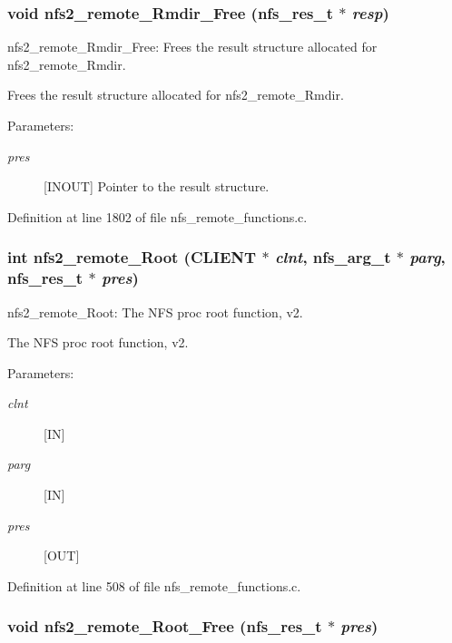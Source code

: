 \subsubsection{\setlength{\rightskip}{0pt plus 5cm}void nfs2\_\-remote\_\-Rmdir\_\-Free (nfs\_\-res\_\-t $\ast$ {\em resp})}\label{group__NFSprocs_ga64}


nfs2\_\-remote\_\-Rmdir\_\-Free: Frees the result structure allocated for nfs2\_\-remote\_\-Rmdir.

Frees the result structure allocated for nfs2\_\-remote\_\-Rmdir.

\begin{Desc}
\item[Parameters:]
\begin{description}
\item[{\em pres}][INOUT] Pointer to the result structure. \end{description}
\end{Desc}


Definition at line 1802 of file nfs\_\-remote\_\-functions.c.
\subsubsection{\setlength{\rightskip}{0pt plus 5cm}int nfs2\_\-remote\_\-Root (CLIENT $\ast$ {\em clnt}, nfs\_\-arg\_\-t $\ast$ {\em parg}, nfs\_\-res\_\-t $\ast$ {\em pres})}\label{group__NFSprocs_ga3}


nfs2\_\-remote\_\-Root: The NFS proc root function, v2.

The NFS proc root function, v2.

\begin{Desc}
\item[Parameters:]
\begin{description}
\item[{\em clnt}][IN] \item[{\em parg}][IN] \item[{\em pres}][OUT] \end{description}
\end{Desc}


Definition at line 508 of file nfs\_\-remote\_\-functions.c.
\subsubsection{\setlength{\rightskip}{0pt plus 5cm}void nfs2\_\-remote\_\-Root\_\-Free (nfs\_\-res\_\-t $\ast$ {\em pres})}\label{group__NFSprocs_ga68}


